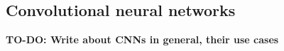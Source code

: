 \subsection{Convolutional neural networks}
\textbf{TO-DO: Write about CNNs in general, their use cases}